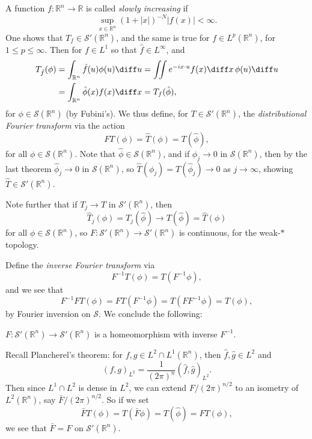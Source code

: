\documentclass[12pt]{article}
\begin{document}
A function $f : \mathbb{R}^n \to \mathbb{R}$ is called \emph{slowly increasing} if
\[
\sup_{x \in \mathbb{R}^n} (1 + |x|)^{-N}|f(x)| < \infty.
\]
One shows that $T_f \in \mathcal{S}'(\mathbb{R}^n)$, and the same is true for $f \in L^p(\mathbb{R}^n)$, for $1 \leq p \leq \infty$. Then for $f \in L^1$ so that $\hat f \in L^\infty$, and
\begin{align*}
	T_{\hat f}(\phi) &= \int_{\mathbb{R}^n} \hat f(u) \phi(u) \diff u = \iint e^{-i x \cdot u}f(x) \diff x \, \phi(u) \diff u \\
			 &= \int_{\mathbb{R}^n} \hat \phi(x) f(x) \diff x = T_f(\hat \phi),
\end{align*}
for $\phi \in \mathcal{S}(\mathbb{R}^n)$ (by Fubini's). We thus define, for $T \in \mathcal{S}'(\mathbb{R}^n)$, the \emph{distributional Fourier transform} via the action
\[
FT(\phi) = \hat T(\phi) = T(\hat \phi),
\]
for all $\phi \in \mathcal{S}(\mathbb{R}^n)$. Note that $\hat \phi \in \mathcal{S}(\mathbb{R}^n)$, and if $\phi_j \to 0$ in $\mathcal{S}(\mathbb{R}^n)$, then by the last theorem $\hat \phi_j \to 0$ in $\mathcal{S}(\mathbb{R}^n)$, so $\hat T(\phi_j) = T(\hat \phi_j) \to 0$ as $j \to \infty$, showing $\hat T \in \mathcal{S}'(\mathbb{R}^n)$.

Note further that if $T_j \to T$ in $\mathcal{S}'(\mathbb{R}^n)$, then
\[
\hat T_j(\phi) = T_j(\hat \phi) \to T(\hat \phi) = \hat T(\phi)
\]
for all $\phi \in \mathcal{S}(\mathbb{R}^n)$, so $F : \mathcal{S}'(\mathbb{R}^n) \to \mathcal{S}'(\mathbb{R}^n)$ is continuous, for the weak-$\ast$ topology.

Define the \emph{inverse Fourier transform} via
\[
F^{-1}T(\phi) = T(F^{-1}\phi),
\]
and we see that
\[
F^{-1}FT(\phi) = FT(F^{-1}\phi) = T(F F^{-1}\phi) = T(\phi),
\]
by Fourier inversion on $\mathcal{S}$. We conclude the following:
\begin{theorem}
	$F : \mathcal{S}'(\mathbb{R}^n) \to \mathcal{S}'(\mathbb{R}^n)$ is a homeomorphism with inverse $F^{-1}$.
\end{theorem}

Recall Plancherel's theorem: for $f, g \in L^2 \cap L^1(\mathbb{R}^n)$, then $\hat f, \hat g \in L^2$ and
\[
	(f, g)_{L^2} = \frac{1}{(2\pi)^n} (\hat f, \hat g)_{L^2}.
\]
Then since $L^1 \cap L^2$ is dense in $L^2$, we can extend $F/(2\pi)^{n/2}$ to an isometry of $L^2(\mathbb{R}^n)$, say $\bar F/(2\pi)^{n/2}$. So if we set 
\[
\bar F T(\phi) = T(\bar F \phi) = T(\hat \phi) = FT(\phi),
\]
we see that $\bar F = F$ on $\mathcal{S}'(\mathbb{R}^n)$.
\end{document}
